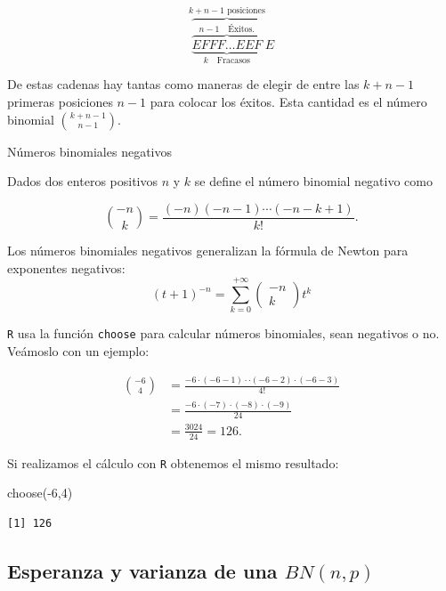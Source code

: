 \documentclass[
  letterpaper,
  DIV=11,
  numbers=noendperiod]{scrreprt}
\newenvironment{Shaded}{\begin{snugshade}}{\end{snugshade}}
\newcommand{\DecValTok}[1]{\textcolor[rgb]{0.68,0.00,0.00}{#1}}
\newcommand{\FunctionTok}[1]{\textcolor[rgb]{0.28,0.35,0.67}{#1}}
\newcommand{\NormalTok}[1]{\textcolor[rgb]{0.00,0.23,0.31}{#1}}
\newcommand{\SpecialCharTok}[1]{\textcolor[rgb]{0.37,0.37,0.37}{#1}}
\begin{document}
\[
\overbrace{\underbrace{\overbrace{EFFF\ldots EEF}^{n-1 \quad \mbox{Éxitos}.}}}_{k \quad\mbox{Fracasos}}^{k+n-1\mbox{ posiciones}}E
\]

De estas cadenas hay tantas como maneras de elegir de entre las
\(k+n-1\) primeras posiciones \(n-1\) para colocar los éxitos. Esta
cantidad es el número binomial \({k+n-1\choose n-1}.\)

\begin{Definicion}{Números binomiales negativos}{}

Dados dos enteros positivos \(n\) y \(k\) se define el número binomial
negativo como

\[\binom{-n}{k}=\frac{(-n)(-n-1)\cdots (-n-k+1)}{k!}.\]

\end{Definicion}

Los números binomiales negativos generalizan la fórmula de Newton para
exponentes negativos: \[
(t+1)^{-n}=\sum_{k=0}^{+\infty}\left(\begin{array}{c} -n
\\ k\end{array}\right) t^{k}
\]

\texttt{R} usa la función \texttt{choose} para calcular números
binomiales, sean negativos o no. Veámoslo con un ejemplo:

\[
\begin{array}{rl}
{-6\choose 4}&=\frac{-6\cdot (-6-1)\cdot \cdot (-6-2)\cdot (-6-3) }{4!}\\
&= \frac{-6\cdot(-7)\cdot (-8)\cdot (-9)}{24}\\
&= \frac{3024}{24}=126.
\end{array}
\]

Si realizamos el cálculo con \texttt{R} obtenemos el mismo resultado:

\begin{Shaded}
\begin{Highlighting}[]
\FunctionTok{choose}\NormalTok{(}\SpecialCharTok{{-}}\DecValTok{6}\NormalTok{,}\DecValTok{4}\NormalTok{)}
\end{Highlighting}
\end{Shaded}

\begin{verbatim}
[1] 126
\end{verbatim}

\subsection{\texorpdfstring{Esperanza y varianza de una
\(BN(n,p)\)}{Esperanza y varianza de una BN(n,p)}}\label{esperanza-y-varianza-de-una-bnnp}
\end{document}
